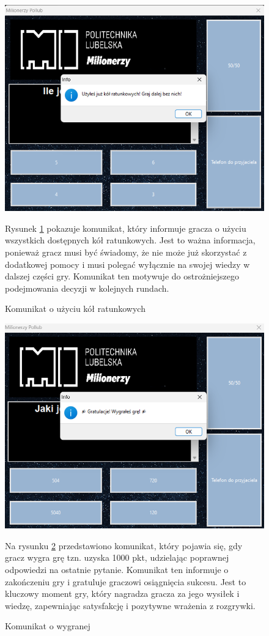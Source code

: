 \documentclass[]{article}
\begin{document}
\begin{figure}[!h]
	\includegraphics[width=\linewidth]{8.png}
	\caption{Komunikat o użyciu kół ratunkowych}
	\label{rys:7}
	Rysunek \ref{rys:7} pokazuje komunikat, który informuje gracza o użyciu wszystkich dostępnych kół ratunkowych. Jest to ważna informacja, ponieważ gracz musi być świadomy, że nie może już skorzystać z dodatkowej pomocy i musi polegać wyłącznie na swojej wiedzy w dalszej części gry. Komunikat ten motywuje do ostrożniejszego podejmowania decyzji w kolejnych rundach.
\end{figure}

\begin{figure}[!h]
	\includegraphics[width=\linewidth]{9.png}
	\caption{Komunikat o wygranej}
	\label{rys:8}
	Na rysunku \ref{rys:8} przedstawiono komunikat, który pojawia się, gdy gracz wygra grę tzn. uzyska 1000 pkt, udzielając poprawnej odpowiedzi na ostatnie pytanie. Komunikat ten informuje o zakończeniu gry i gratuluje graczowi osiągnięcia sukcesu. Jest to kluczowy moment gry, który nagradza gracza za jego wysiłek i wiedzę, zapewniając satysfakcję i pozytywne wrażenia z rozgrywki.
\end{figure}
\end{document}
